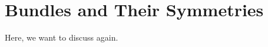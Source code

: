 \chapter{Bundles and Their Symmetries}\label{chapter:chapter}

Here, we want to discuss \cite{dieck2008algebraic} again.
